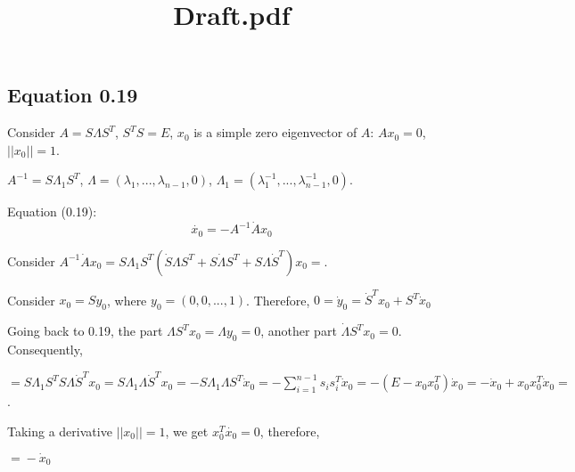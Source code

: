 \documentclass[a4paper]{article}
\date{}
\title{Draft.pdf}
\begin{document}
\maketitle
\subsection*{Equation 0.19}
Consider $A=S\Lambda S^T$, $S^TS=E$, $x_0$ is a simple zero eigenvector of $A$: $Ax_0=0$, $||x_0||=1$.

$A^{-1}=S\Lambda_1S^T$, $\Lambda=(\lambda_1,...,\lambda_{n-1},0)$, $\Lambda_1=(\lambda_1^{-1},...,\lambda_{n-1}^{-1},0)$.

Equation (0.19):
$$\dot{x_0}=-A^{-1}\dot{A}x_0$$

Consider $A^{-1}\dot{A}x_0=S\Lambda_1S^T(\dot{S}\Lambda S^T+S\dot{\Lambda} S^T+S\Lambda \dot{S}^T)x_0\boxed{=}$.

Consider $x_0=Sy_0$, where $y_0=(0,0,...,1)$. Therefore, $0=\dot{y}_0=\dot{S}^Tx_0+S^T\dot{x}_0$

Going back to 0.19, the part $\Lambda S^Tx_0=\Lambda y_0=0$, another part $\dot{\Lambda}S^Tx_0=0$. Consequently,

$\boxed{=}S\Lambda_1S^TS\Lambda \dot{S}^Tx_0=S\Lambda_1\Lambda\dot{S}^Tx_0=-S\Lambda_1\Lambda S^T\dot{x}_0=-\sum\limits_{i=1}^{n-1}s_is_i^T\dot{x}_0=-(E-x_0x_0^T)\dot{x}_0=-\dot{x}_0+x_0x_0^T\dot{x}_0\boxed{=}$.

Taking a derivative $||x_0||=1$, we get $x_0^T\dot{x_0}=0$, therefore,

$\boxed{=}-\dot{x}_0$
\end{document}
